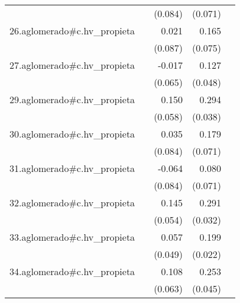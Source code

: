 {\begin{longtable}{l*{4}{D{.}{.}{-1}}}
            &                     &     (0.084)         &     (0.071)         &                     \\
\addlinespace
26.aglomerado#c.hv\_propieta&                     &       0.021         &       0.165\sym{*}  &                     \\
            &                     &     (0.087)         &     (0.075)         &                     \\
\addlinespace
27.aglomerado#c.hv\_propieta&                     &      -0.017         &       0.127\sym{**} &                     \\
            &                     &     (0.065)         &     (0.048)         &                     \\
\addlinespace
29.aglomerado#c.hv\_propieta&                     &       0.150\sym{*}  &       0.294\sym{***}&                     \\
            &                     &     (0.058)         &     (0.038)         &                     \\
\addlinespace
30.aglomerado#c.hv\_propieta&                     &       0.035         &       0.179\sym{*}  &                     \\
            &                     &     (0.084)         &     (0.071)         &                     \\
\addlinespace
31.aglomerado#c.hv\_propieta&                     &      -0.064         &       0.080         &                     \\
            &                     &     (0.084)         &     (0.071)         &                     \\
\addlinespace
32.aglomerado#c.hv\_propieta&                     &       0.145\sym{**} &       0.291\sym{***}&                     \\
            &                     &     (0.054)         &     (0.032)         &                     \\
\addlinespace
33.aglomerado#c.hv\_propieta&                     &       0.057         &       0.199\sym{***}&                     \\
            &                     &     (0.049)         &     (0.022)         &                     \\
\addlinespace
34.aglomerado#c.hv\_propieta&                     &       0.108         &       0.253\sym{***}&                     \\
            &                     &     (0.063)         &     (0.045)         &                     \\

\end{longtable}}
